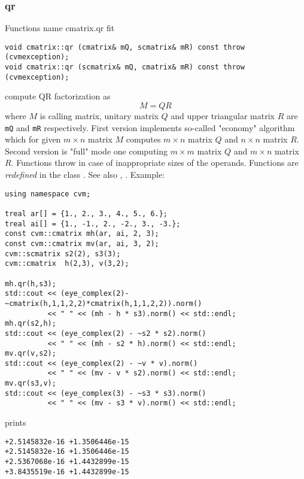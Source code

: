 \subsubsection{qr}
Functions%
\pdfdest name {cmatrix.qr} fit
\begin{verbatim}
void cmatrix::qr (cmatrix& mQ, scmatrix& mR) const throw (cvmexception);
void cmatrix::qr (scmatrix& mQ, cmatrix& mR) const throw (cvmexception);
\end{verbatim}
compute QR factorization as
\begin{equation*}
M=QR
\end{equation*}
where 
$M$ is  calling matrix, unitary matrix $Q$ 
and upper triangular matrix $R$ are \verb"mQ" and \verb"mR"
respectively. First version implements so-called "economy" algorithm
which for  given $m\times n$ matrix $M$ computes $m\times n$ matrix $Q$
and $n\times n$ matrix $R$. Second version is  "full" mode one 
computing $m\times m$ matrix $Q$ and $m\times n$ matrix $R$.
Functions throw
in case of inappropriate sizes of the operands.
Functions are \emph{redefined} in the class
.
See also ,
.
Example:
\begin{Verbatim}
using namespace cvm;

treal ar[] = {1., 2., 3., 4., 5., 6.};
treal ai[] = {1., -1., 2., -2., 3., -3.};
const cvm::cmatrix mh(ar, ai, 2, 3);
const cvm::cmatrix mv(ar, ai, 3, 2);
cvm::scmatrix s2(2), s3(3);
cvm::cmatrix  h(2,3), v(3,2);

mh.qr(h,s3);
std::cout << (eye_complex(2)-~cmatrix(h,1,1,2,2)*cmatrix(h,1,1,2,2)).norm()
          << " " << (mh - h * s3).norm() << std::endl;
mh.qr(s2,h);
std::cout << (eye_complex(2) - ~s2 * s2).norm()
          << " " << (mh - s2 * h).norm() << std::endl;
mv.qr(v,s2);
std::cout << (eye_complex(2) - ~v * v).norm()
          << " " << (mv - v * s2).norm() << std::endl;
mv.qr(s3,v);
std::cout << (eye_complex(3) - ~s3 * s3).norm()
          << " " << (mv - s3 * v).norm() << std::endl;
\end{Verbatim}
prints
\begin{Verbatim}
+2.5145832e-16 +1.3506446e-15
+2.5145832e-16 +1.3506446e-15
+2.5367068e-16 +1.4432899e-15
+3.8435519e-16 +1.4432899e-15
\end{Verbatim}
\newpage




